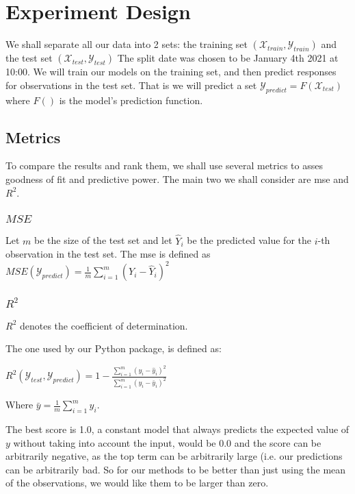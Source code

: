 \chapter{Experiment Design}
We shall separate all our data into 2 sets: the training set $(\mathcal{X}_{train},\mathcal{Y}_{train})$ and the test set $(\mathcal{X}_{test},\mathcal{Y}_{test})$
The split date was chosen to be January 4th 2021 at 10:00.
We will train our models on the training set, and then predict responses for observations in the test set. That is we will predict a set $\mathcal{Y}_{predict} = F(\mathcal{X}_{test})$ where $F()$ is the model's prediction function.

\section{Metrics}

To compare the results and rank them, we shall use several metrics to asses goodness of fit and predictive power. The main two we shall consider are \acrfull{mse} and $R^2$.
\subsection{$MSE$}
Let $m$ be the size of the test set and let $\hat{Y}_i$ be the predicted value for the $i$-th observation in the test set.
The \acrlong{mse} is defined as $MSE(\mathcal{Y}_{predict}) = \frac{1}{m}\sum_{i=1}^m (Y_i - \hat{Y}_i)^2$
\subsection{$R^2$}
$R^2$ denotes the coefficient of determination.

The one used by our Python package, is defined as:

$R^2(\mathcal{Y}_{test},\mathcal{Y}_{predict}) = 1 - \frac{\sum_{i=1}^m(y_i - \hat{y}_i)^2}{\sum_{i=1}^m(y_i - \bar{y}_i)^2}$

Where $\bar{y} = \frac{1}{m} \sum_{i=1}^m y_i$. %

The best score is 1.0, a constant model that always predicts the expected value of $y$ without taking into account the input, would be 0.0 and the score can be arbitrarily negative, as the top term can be arbitrarily large (i.e. our predictions can be arbitrarily bad. So for our methods to be better than just using the mean of the observations, we would like them to be larger than zero.

